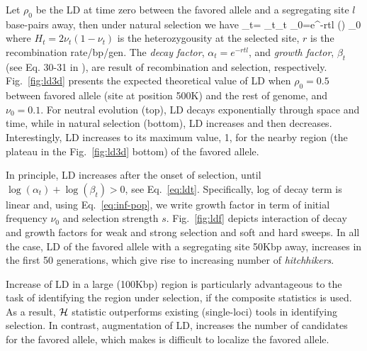 Let $\rho_0$ be the LD at time zero between the favored allele and a 
segregating site $l$ base-pairs away, then under natural selection we have
\beq
\rho_t= \alpha_t\beta_t \rho_0=e^{-rtl} \left(\right)  
\rho_0\label{eq:ldt}
\eeq
where $H_t=2\nu_t(1-\nu_t)$ is the heterozygousity at the selected site, $r$ is 
the recombination rate/bp/gen. The 
\emph{decay factor}, $\alpha_t=e^{-rtl}$,
and \emph{growth factor}, $\beta_t$ (see Eq. 30-31 in 
\cite{Stephan2006The}), are result of recombination and 
selection, respectively. Fig.~\ref{fig:ld3d} presents the expected theoretical 
value of LD when $\rho_0=0.5$ between favored allele (site at position 500K) 
and the rest of 
genome, and $\nu_0=0.1$. For neutral evolution (top), LD decays exponentially 
through space and time, while in natural selection (bottom), LD increases and 
then decreases. Interestingly, LD increases to its maximum value, 1, for the 
nearby region (the plateau in the Fig.~\ref{fig:ld3d} bottom) of the favored 
allele.

In principle, LD increases after the onset of selection, until $\log(\alpha_t) 
+\log(\beta_t) 
>0$, see Eq.~\ref{eq:ldt}. 
Specifically, log of decay term is linear and, using 
Eq.~\ref{eq:inf-pop}, we write growth 
factor in term of initial frequency $\nu_0$ and selection strength $s$. 
Fig.~\ref{fig:ldf} depicts interaction of decay and growth factors for weak and 
strong selection and soft and hard sweeps. In all the case, LD of the 
favored allele with a segregating site 50Kbp away, increases in the first 50 
generations, which give rise to increasing number of \emph{hitchhikers}. 

Increase of LD in a large (100Kbp) region is particularly advantageous to the 
task of identifying the region under selection, if the composite statistics is 
used. As a result, ${\cal H}$ statistic outperforms existing (single-loci) tools in 
identifying selection. In contrast, augmentation of LD, increases the 
number 
of candidates for 
the favored allele, which makes is difficult to localize the favored 
allele.

\clearpage
\newpage

